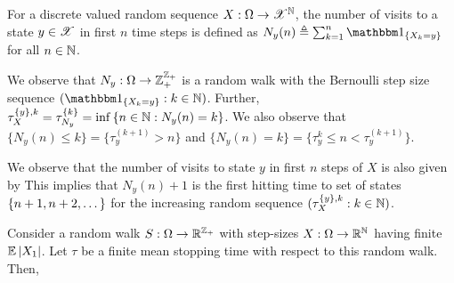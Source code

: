 \documentclass[a4paper,10pt,english]{article}
\begin{document}
\begin{defn} 
For a discrete valued random sequence $X:\Omega\to\mathscr{X}^{\mathbb{N}}$, the number of visits to a state $y \in \mathscr{X}$ in first $n$ time steps is defined as $N_y(n) \triangleq \sum_{k=1}^n\SetIn{X_k = y}$ for all $n \in \mathbb{N}$. 
\end{defn}
\begin{rem}
We observe that $N_y:\Omega\to\mathbb{Z}_+^{\mathbb{Z}_+}$ is a random walk with the Bernoulli step size sequence $(\SetIn{X_k = y}: k \in \N)$. 
Further, $\tau_X^{\left\{y\right\}, k} = \tau_{N_y}^{\left\{k\right\}} = \inf\left\{n \in \mathbb{N}: N_y(n) = k\right\}$. 
We also observe that $\{N_y(n) \le k\} = \{\tau_y^{(k+1)} > n\}$ and $\{N_y(n) = k\} = \{\tau_y^{k} \le n < \tau_y^{(k+1)}\}$. 
\end{rem}
\begin{rem}
We observe that the number of visits to state $y$ in first $n$ steps of $X$ is also given by 
This implies that $N_y(n)+1$ is the first hitting time to set of states $\left\{n+1, n+2, \dots \right\}$ for the increasing random sequence $(\tau_X^{\left\{y\right\},k}:k \in \mathbb{N})$. 
\end{rem}
\begin{lem} 
Consider a random walk $S: \Omega \to \mathbb{R}^{\mathbb{Z}_+}$ with \iid step-sizes $X: \Omega \to  \mathbb{R}^{\mathbb{N}}$ having finite $\mathbb{E}\left\lvert X_1\right\rvert$. 
Let $\tau$ be a finite mean stopping time with respect to this random walk. 
Then,
\end{lem}
\end{document}
